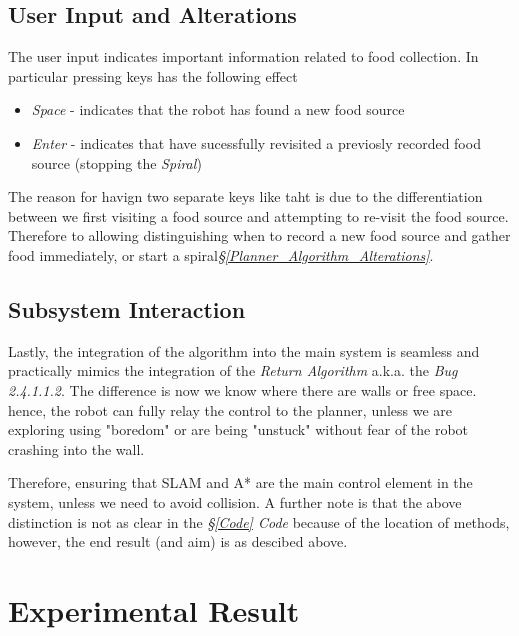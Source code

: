 \documentclass[11pt, a4paper]{article}
\begin{document}


\subsection{User Input and Alterations}
\label{Planner_User_Input}

The user input indicates important information related to food collection. In particular pressing keys has the following effect

\begin{itemize}
	\item \textit{Space} - indicates that the robot has found a new food source
	\item \textit{Enter} - indicates that have sucessfully revisited a previosly recorded food source (stopping the \textit{Spiral})

\end{itemize}

The reason for havign two separate keys like taht is due to the differentiation between we first visiting a food source and attempting to re-visit the food source. Therefore to allowing distinguishing when to record a new food source and gather food immediately, or start a spiral\textit{\S\ref{Planner_Algorithm_Alterations}}. 


\subsection{Subsystem Interaction}

Lastly, the integration of the algorithm into the main system is seamless and practically mimics the integration of the \textit{Return Algorithm}\cite{task2_report} a.k.a. the \textit{Bug 2.4.1.1.2}. The difference is now we know where there are walls or free space. hence, the robot can fully relay the control to the planner, unless we are exploring using "boredom"\cite{task2_report} or are being "unstuck"\cite{task2_report} without fear of the robot crashing into the wall. 

Therefore, ensuring that SLAM and A* are the main control element in the system, unless we need to avoid collision. A further note is that the above distinction is not as clear in the \textit{\S\ref{Code} Code} because of the location of methods, however, the end result (and aim) is as descibed above.


\section{Experimental Result}
\label{Experimental_Results}
\end{document}
